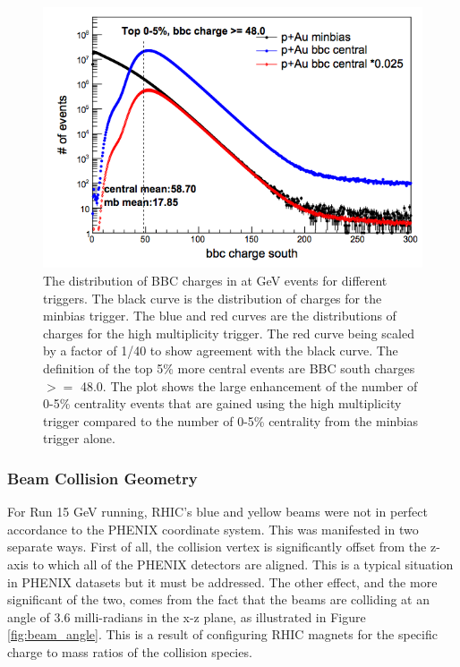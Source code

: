 \begin{figure}[h!]
\begin{center}
\includegraphics[scale=0.55]{figs/pAu_centrality_trigger.png}
\end{center}
\caption{The distribution of BBC charges in \pau at  GeV events for different triggers. The black curve is the distribution of charges for the minbias trigger. The blue and red curves are the distributions of charges for the high multiplicity trigger. The red curve being scaled by a factor of 1/40 to show agreement with the black curve. The definition of the top 5\% more central events are BBC south charges $>=$ 48.0. The plot shows the large enhancement of the number of 0-5\% centrality events that are gained using the high multiplicity trigger compared to the number of 0-5\% centrality from the minbias trigger alone.}\label{fig:pau_centrality_trig}

\end{figure}

\subsubsection{Beam Collision Geometry}
For Run 15  GeV running, RHIC's blue and yellow beams were not in perfect accordance to the PHENIX coordinate system. This was manifested in two separate ways.
First of all, the collision vertex is significantly offset from the z-axis to which all of the PHENIX detectors are aligned. This is a typical situation in PHENIX datasets but it must be addressed. The other effect, and the more significant of the two, comes from the fact that the beams are colliding at an angle of 3.6 milli-radians in the x-z plane, as illustrated in Figure \ref{fig:beam_angle}. This is a result of configuring RHIC magnets for the specific charge to mass ratios of the \pau collision species.

